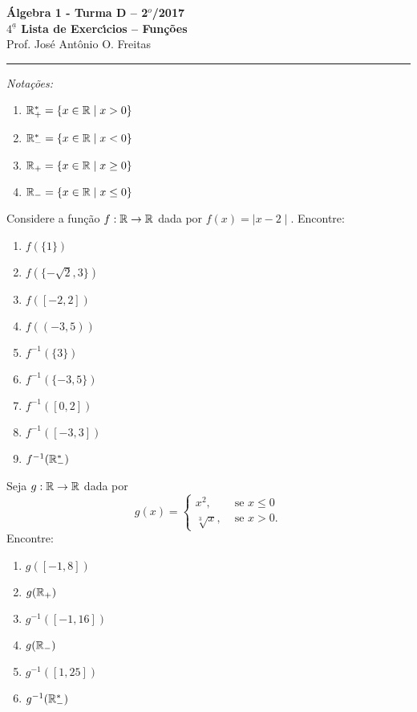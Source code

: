 \documentclass[12pt]{article}
\begin{document}


\begin{center}
{\Large\bf {\'A}lgebra 1 - Turma D -- 2$^{o}$/2017} \\ \vspace{9pt} {\large\bf
  $4^{\underline{a}}$ Lista de Exerc{\'\i}cios -- Funções}\\
\vspace{9pt} Prof. Jos{\'e} Ant{\^o}nio O. Freitas
\end{center}
\hrule

\vspace{.6cm}

\begin{center}
	\textit{Notações:}
\end{center}
\begin{multicols}{2}
	\begin{enumerate}
		\item $\mathbb{R}^*_+ = \{x \in \mathbb{R} \mid x > 0\}$
		\item $\mathbb{R}^*_- = \{x \in \mathbb{R} \mid x < 0\}$
		\item $\mathbb{R}_+ = \{x \in \mathbb{R} \mid x \ge 0\}$
		\item $\mathbb{R}_- = \{x \in \mathbb{R} \mid x \le 0\}$
	\end{enumerate}
\end{multicols}

\questao Considere a função $f : \mathbb{R} \to \mathbb{R}$ dada por $f(x) = \mid x - 2\mid$. Encontre:
\begin{multicols}{3}
	\begin{enumerate}
		\item $f(\{1\})$
		\item $f(\{-\sqrt{2}, 3\})$
		\item $f([-2,2])$
		\item $f((-3,5))$
		\item $f^{-1}(\{3\})$
		\item $f^{-1}(\{-3,5\})$
		\item $f^{-1}([0,2])$
		\item $f^{-1}([-3,3])$
		\item $f^{-1}(\mathbb{R}^*_-)$
	\end{enumerate}
\end{multicols}

\vesp

\questao Seja $g : \mathbb{R} \to \mathbb{R}$ dada por
\[
	g(x) = \begin{cases}
		x^2,& \mbox{ se } x \le 0\\
		\sqrt[3]{x}, & \mbox{ se } x > 0.
	\end{cases}
\]
Encontre:
\begin{multicols}{2}
	\begin{enumerate}
		\item $g([-1,8])$
		\item $g(\mathbb{R}_+)$
		\item $g^{-1}([-1,16])$
		\item $g(\mathbb{R}_-)$
		\item $g^{-1}([1,25])$
		\item $g^{-1}(\mathbb{R}^*_-)$
	\end{enumerate}	
\end{multicols}
\end{document}
